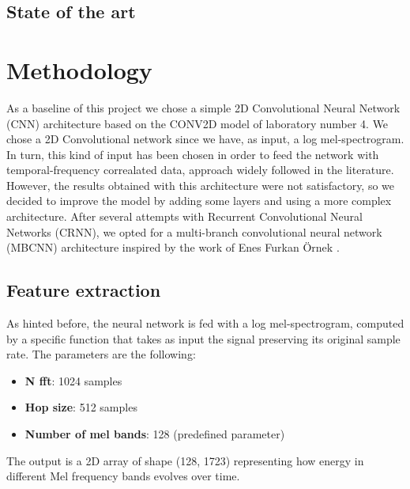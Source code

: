 \documentclass{article}
\begin{document}
\begin{sloppy}
\subsection{State of the art}
\label{sec:state_of_the_art}


\section{Methodology}
\label{sec:methodology}
As a baseline of this project we chose a simple 2D Convolutional Neural Network (CNN) architecture based on the CONV2D model of laboratory number 4.
We chose a 2D Convolutional network since we have, as input, a log mel-spectrogram. In turn, this kind of input has been chosen in order to feed the network with
temporal-frequency correalated data, approach widely followed in the literature. However, the results obtained with this architecture were not satisfactory,
so we decided to improve the model by adding some layers and using a more complex architecture. After several attempts with Recurrent Convolutional Neural Networks (CRNN),
we opted for a multi-branch convolutional neural network (MBCNN) architecture inspired by the work of Enes Furkan Örnek \cite{audio_classification_esc50, latifi2025classificationheartsoundsusing}.

\subsection{Feature extraction}
\label{sec:feature_extraction}
As hinted before, the neural network is fed with a log mel-spectrogram, computed by a specific function that takes as input
the signal preserving its original sample rate. The parameters are the following:
\begin{itemize}
    \item \textbf{N fft}: 1024 samples
    \item \textbf{Hop size}: 512 samples
    \item \textbf{Number of mel bands}: 128 (predefined parameter)
\end{itemize}
The output is a 2D array of shape (128, 1723) representing how energy in different Mel frequency bands evolves over time.


\end{sloppy}
\end{document}
